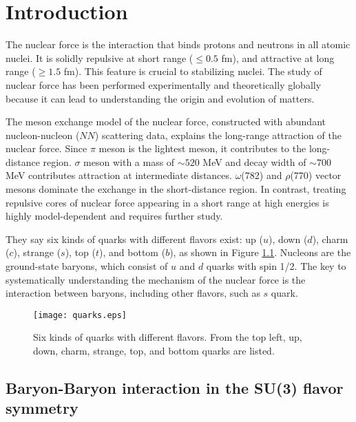 %
\graphicspath{{./pictures/chapter1/}}

\chapter{Introduction} 
\label{chap1}
The nuclear force is the interaction that binds protons and neutrons in all atomic nuclei. It is solidly repulsive at short range ($\leq0.5$ fm), and attractive at long range ($\geq1.5$ fm). This feature is crucial to stabilizing nuclei. The study of nuclear force has been performed experimentally and theoretically globally because it can lead to understanding the origin and evolution of matters. 

The meson exchange model of the nuclear force, constructed with abundant nucleon-nucleon ($NN$) scattering data, explains the long-range attraction of the nuclear force. Since $\pi$ meson is the lightest meson, it contributes to the long-distance region. $\sigma$ meson with a mass of $\sim520$ MeV and decay width of $\sim700$ MeV contributes attraction at intermediate distances. $\omega$(782) and $\rho$(770) vector mesons dominate the exchange in the short-distance region. In contrast, treating repulsive cores of nuclear force appearing in a short range at high energies is highly model-dependent and requires further study. 

They say six kinds of quarks with different flavors exist: up ($u$), down ($d$), charm ($c$), strange ($s$), top ($t$), and bottom ($b$), as shown in Figure \ref{fig-quarks}. Nucleons are the ground-state baryons, which consist of $u$ and $d$ quarks with spin 1/2. The key to systematically understanding the mechanism of the nuclear force is the interaction between baryons, including other flavors, such as $s$ quark.
\begin{figure}[h!]
  \begin{center}
  \texttt{[image: quarks.eps]}
  \caption{Six kinds of quarks with different flavors. From the top left, up, down, charm, strange, top, and bottom quarks are listed.}
  \label{fig-quarks}
  \end{center}
\end{figure}

\section{Baryon-Baryon interaction in the SU(3) flavor symmetry}
\label{sec-BBint}

